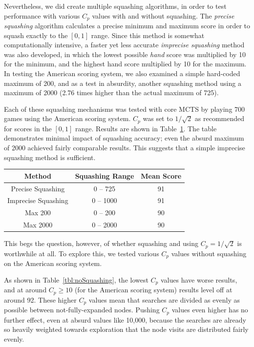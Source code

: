 \documentclass[letterpaper]{article}
\begin{document}
Nevertheless, we did create multiple squashing algorithms, in order to test performance with various $C_p$ values with and without squashing. The {\it precise squashing} algorithm calculates a precise minimum and maximum score in order to squash exactly to the $[0,1]$ range. Since this method is somewhat computationally intensive, a faster yet less accurate {\it imprecise squashing} method was also developed, in which the lowest possible {\it hand} score was multiplied by 10 for the minimum, and the highest hand score multiplied by 10 for the maximum. In testing the American scoring system, we also examined a simple hard-coded maximum of 200, and as a test in absurdity, another squashing method using a maximum of 2000 (2.76 times higher than the actual maximum of 725).

Each of these squashing mechanisms was tested with core MCTS by playing 700 games using the American scoring system. $C_p$ was set to $1 / \sqrt{2}$ as recommended for scores in the $[0,1]$ range. Results are shown in Table~\ref{tbl:Squashing}. The table demonstrates minimal impact of squashing accuracy; even the absurd maximum of 2000 achieved fairly comparable results. This suggests that a simple imprecise squashing method is sufficient.

\begin{table}
\label{tbl:Squashing}
\centering
\begin{tabular}{c c c}
\hline
Method & Squashing Range & Mean Score \\
\hline
Precise Squashing & 0 -- 725 & 91 \\
Imprecise Squashing & 0 -- 1000 & 91 \\
Max 200 & 0 -- 200 & 90 \\
Max 2000 & 0 -- 2000 & 90 \\
\hline
\end{tabular}
\end{table}

This begs the question, however, of whether squashing and using $C_p = 1 / \sqrt{2}$ is worthwhile at all. To explore this, we tested various $C_p$ values without squashing on the American scoring system.

As shown in  Table~\ref{tbl:noSquashing}, the lowest $C_p$ values have worse results, and at around $C_p \geq 10$ (for the American scoring system) results level off at around 92. These higher $C_p$ values mean that searches are divided as evenly as possible between not-fully-expanded nodes. Pushing $C_p$ values even higher has no further effect, even at absurd values like 10,000, because the searches are already so heavily weighted towards exploration that the node visits are distributed fairly evenly.
\end{document}
